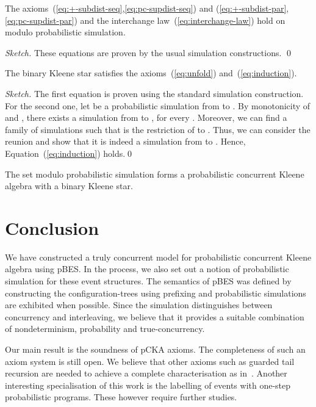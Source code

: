 \documentclass{llncs}
\newcommand{\<}{\langle}
\renewcommand{\>}{\rangle}
\begin{document}
\begin{proposition}\label{pro:subdistributivity}
The axioms~(\ref{eq:+-subdist-seq},\ref{eq:pc-supdist-seq}) and (\ref{eq:+-subdist-par},\ref{eq:pc-supdist-par}) and the interchange law~(\ref{eq:interchange-law}) hold on  modulo probabilistic simulation.
\end{proposition}

\begin{proof}[Sketch]
These equations are proven by the usual simulation constructions.
\qed
\end{proof}

\begin{proposition}\label{pro:kleene-star}
The binary Kleene star satisfies the axioms~(\ref{eq:unfold}) and~(\ref{eq:induction}).
\end{proposition}
\begin{proof}[Sketch]
The first equation is proven using the standard simulation construction. For the second one, let  be a probabilistic simulation from  to . By monotonicity of  and , there exists a simulation  from  to , for every . Moreover, we can find a family of simulations such that  is the restriction of  to . Thus, we can consider the reunion  and show that it is indeed a simulation from  to . Hence, Equation~(\ref{eq:induction}) holds.\qed
\end{proof}

\begin{theorem}
The set  modulo probabilistic simulation forms a probabilistic concurrent Kleene algebra with a binary Kleene star.
\end{theorem}

\section{Conclusion}

We have constructed a truly concurrent model for probabilistic concurrent Kleene algebra using pBES. In the process, we also set out a notion of probabilistic simulation for these event structures. The semantics of pBES was defined by constructing the configuration-trees using prefixing and probabilistic simulations are exhibited when possible. Since the simulation distinguishes between concurrency and interleaving, we believe that it provides a suitable combination of nondeterminism, probability and true-concurrency.

Our main result is the soundness of pCKA axioms. The completeness of such an axiom system is still open. We believe that other axioms such as guarded tail recursion are needed to achieve a complete characterisation as in~\cite{Seg04}. Another interesting specialisation of this work is the labelling of events with one-step probabilistic programs. These however require further studies.
\end{document}
